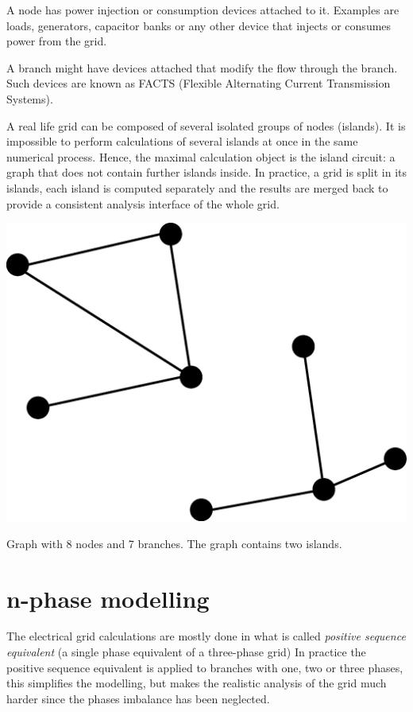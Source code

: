 \documentclass[a4paper,twoside,fleqn]{tufte-book}
\begin{document}
A node has power injection or consumption devices attached to it. Examples are loads, generators, capacitor banks or any other device that injects or consumes power from the grid.

A branch might have devices attached that modify the flow through the branch. Such devices are known as FACTS (Flexible Alternating Current Transmission Systems). 

A real life grid can be composed of several isolated groups of nodes (islands). It is impossible to perform calculations of several islands at once in the same numerical process. Hence, the maximal calculation object is the island circuit: a graph that does not contain further islands inside. In practice, a grid is split in its islands, each island is computed separately and the results are merged back to provide a consistent analysis interface of the whole grid.
\begin{marginfigure}
  \includegraphics[width=\linewidth]{img/simple_two_island_graph.eps}
  \caption{Graph with 8 nodes and 7 branches. The graph contains two islands.}
  \label{fig:simple_two_island_graph}
\end{marginfigure}



\section{n-phase modelling}

The electrical grid calculations are mostly done in what is called \textit{positive sequence equivalent} (a single phase equivalent of a three-phase grid) In practice the positive sequence equivalent is applied to branches with one, two or three phases, this simplifies the modelling, but makes the realistic analysis of the grid much harder since the phases imbalance has been neglected.
\end{document}
